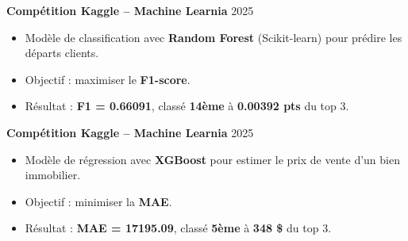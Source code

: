 \documentclass[a4paper,12pt]{article}
\begin{document}
\begin{paracol}{2}
\begin{rightcolumn}
\begin{minipage}[t][\dimexpr\textheight - 9em\relax][t]{\dimexpr\linewidth - 1.5em\relax}
{\textbf{Compétition Kaggle – Machine Learnia} \hfill {\color{blue}2025}  
\begin{itemize}[leftmargin=1em, nosep]
  \vspace{0.2em}
  \item Modèle de classification avec \textbf{Random Forest} (Scikit-learn) pour prédire les départs clients.
  \item Objectif : maximiser le \textbf{F1-score}. 
  \item Résultat : \textbf{F1 = 0.66091}, classé \textbf{14ème} à \textbf{0.00392 pts} du top 3.
\end{itemize}

\vspace{0.7em}

\textbf{Compétition Kaggle – Machine Learnia} \hfill {\color{blue}2025}  
\begin{itemize}[leftmargin=1em, nosep]
  \vspace{0.2em}
  \item Modèle de régression avec \textbf{XGBoost} pour estimer le prix de vente d’un bien immobilier.
  \item Objectif : minimiser la \textbf{MAE}. 
  \item Résultat : \textbf{MAE = 17195.09}, classé \textbf{5ème} à \textbf{348 \$} du top 3.
\end{itemize}

} %
\end{minipage}
\end{rightcolumn}

\end{paracol}
\end{document}
